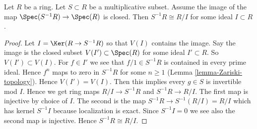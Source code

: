 \begin{lemma}
\label{lemma-invert-closed-quotient}
Let $R$ be a ring. Let $S \subset R$ be a multiplicative subset.
Assume the image of the map $\Spec(S^{-1}R) \to \Spec(R)$
is closed. Then $S^{-1}R \cong R/I$ for some ideal $I \subset R$.
\end{lemma}

\begin{proof}
Let $I = \Ker(R \to S^{-1}R)$ so that $V(I)$ contains the image.
Say the image is the closed subset $V(I') \subset \Spec(R)$ for
some ideal $I' \subset R$. So $V(I') \subset V(I)$.
For $f \in I'$ we see that $f/1 \in S^{-1}R$
is contained in every prime ideal. Hence $f^n$ maps to zero in $S^{-1}R$
for some $n \geq 1$ (Lemma \ref{lemma-Zariski-topology}).
Hence $V(I') = V(I)$.
Then this implies every $g \in S$ is invertible mod $I$.
Hence we get ring maps $R/I \to S^{-1}R$ and $S^{-1}R \to R/I$.
The first map is injective by choice of $I$.
The second is the map $S^{-1}R \to S^{-1}(R/I) = R/I$ which
has kernel $S^{-1}I$ because localization is exact.
Since $S^{-1}I = 0$ we see also the second map is injective.
Hence $S^{-1}R \cong R/I$.
\end{proof}